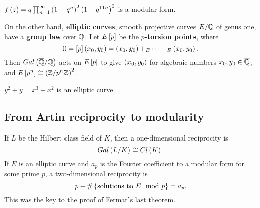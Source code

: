 \begin{example*}
$ f\rb{z} = q\prod_{n = 1}^\infty \rb{1 - q^n}^2\rb{1 - q^{11n}}^2 $ is a modular form.
\end{example*}

On the other hand, \textbf{elliptic curves}, smooth projective curves $ E / \Q $ of genus one, have a \textbf{group law} over $ \Q $. Let $ E\sb{p} $ be the \textbf{$ p $-torsion points}, where
$$ 0 = \sb{p}\rb{x_0, y_0} = \rb{x_0, y_0} +_E \dots +_E \rb{x_0, y_0}. $$
Then $ Gal\rb{\overline{\Q} / \Q} $ acts on $ E\sb{p} $ to give $ \rb{x_0, y_0} $ for algebraic numbers $ x_0, y_0 \in \overline{\Q} $, and $ E\sb{p^n} \cong \rb{\Z / p^n\Z}^2 $.

\begin{example*}
$ y^2 + y = x^3 - x^2 $ is an elliptic curve.
\end{example*}

\subsection{From Artin reciprocity to modularity}

If $ L $ be the Hilbert class field of $ K $, then a one-dimensional reciprocity is
$$ Gal\rb{L / K} \cong Cl\rb{K}. $$
If $ E $ is an elliptic curve and $ a_p $ is the Fourier coefficient to a modular form for some prime $ p $, a two-dimensional reciprocity is
$$ p - \#\cb{\text{solutions to} \ E \mod p} = a_p. $$
This was the key to the proof of Fermat's last theorem.

